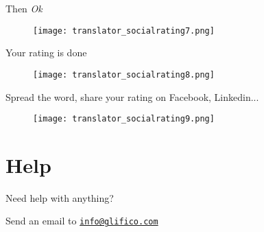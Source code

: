 \documentclass[11 pt, a4paper]{article}
\begin{document}
Then \textit{Ok}
\begin{figure}[H]
\centering
\texttt{[image: translator\_socialrating7.png]}
\end{figure}


\clearpage
Your rating is done
\begin{figure}[H]
\centering
\texttt{[image: translator\_socialrating8.png]}
\end{figure}

Spread the word, share your rating on Facebook, Linkedin...
\begin{figure}[H]
\centering
\texttt{[image: translator\_socialrating9.png]}
\end{figure}

\clearpage
\section{Help}
Need help with anything?

Send an email to \href{mailto:info@glifico.com}{\nolinkurl{info@glifico.com}}
\end{document}
